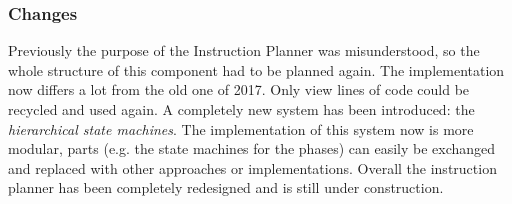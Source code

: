 \subsubsection{Changes}
Previously the purpose of the Instruction Planner was misunderstood, so the whole structure of this component had to be planned again. The implementation now differs a lot from the old one of 2017. Only view lines of code could be recycled and used again. A completely new system has been introduced: the \textit{hierarchical state machines}. The implementation of this system now is more modular, parts (e.g. the state machines for the phases) can easily be exchanged and replaced with other approaches or implementations. Overall the instruction planner has been completely redesigned and is still under construction.
%
%
%


